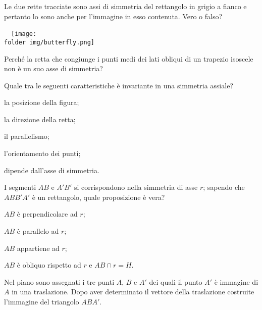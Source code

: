 \noindent\begin{minipage}{0.75\textwidth}\parindent15pt
\begin{esercizio}
	\label{ese:8.25}
	Le due rette tracciate sono assi di simmetria del rettangolo 
in grigio a fianco e pertanto lo sono anche per l'immagine in esso 
contenuta. Vero o falso?
\end{esercizio}
\end{minipage}\hfil
\begin{minipage}{0.25\textwidth}
	
\centering~~\texttt{[image: \\folder img/butterfly.png]}
\end{minipage}%

\begin{esercizio}
\label{ese:8.26}
Perché la retta che congiunge i punti medi dei lati obliqui di un 
trapezio isoscele non è un suo asse di simmetria?
\end{esercizio}


\begin{esercizio}
\label{ese:8.40} %
Quale tra le seguenti caratteristiche è invariante in una simmetria 
assiale?
\begin{enumeratea}
\item la posizione della figura;
\item la direzione della retta;
\item il parallelismo;
\item l'orientamento dei punti;
\item dipende dall'asse di simmetria.
\end{enumeratea}
\end{esercizio}

\begin{esercizio}
\label{ese:8.41} %
I segmenti \(AB\) e \(A'B'\) si corrispondono nella simmetria di asse 
\(r\); sapendo che \(ABB'A'\) è un rettangolo, quale proposizione è vera?
\begin{enumeratea}
\item \(AB\) è perpendicolare ad \(r\);
\item \(AB\) è parallelo ad \(r\);
\item \(AB\) appartiene ad \(r\);
\item \(AB\) è obliquo rispetto ad \(r\) e \(AB\cap r=H\).
\end{enumeratea}
\end{esercizio}

\begin{esercizio}
\label{ese:8.44} %
Nel piano sono assegnati i tre punti \(A\), \(B\) e \(A'\) dei quali il 
punto \(A'\) è immagine di \(A\) in una traslazione. Dopo aver 
determinato il vettore della traslazione costruite l'immagine del 
triangolo \(ABA'\).
\end{esercizio}
\begin{minipage}{0.25\textwidth}
	\centering~~
\end{minipage}\vspace{8pt}

